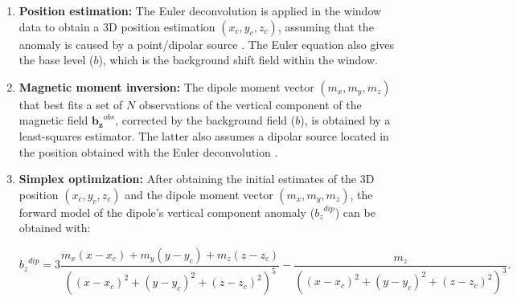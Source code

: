\begin{enumerate}
    \item \textbf{Position estimation:} The Euler deconvolution is applied in the window data to obtain a 3D position estimation $(x_c, y_c, z_c)$, assuming that the anomaly is caused by a point/dipolar source \cite[after][]{Reid1990}. The Euler equation also gives the base level ($b$), which is the background shift field within the window.
    
    \item \textbf{Magnetic moment inversion:} The dipole moment vector $(m_x, m_y, m_z)$ that best fits a set of $N$ observations of the vertical component of the magnetic field $\mathbf{b_z}^{obs}$, corrected by the background field ($b$), is obtained by a least-squares estimator. The latter also assumes a dipolar source located in the position obtained with the Euler deconvolution \citep[\textit{e.g.}][]{Oliveira2015Estimation}.
    
    \item \textbf{Simplex optimization:} After obtaining the initial estimates of the 3D position $(x_c, y_c, z_c)$ and the dipole moment vector $(m_x, m_y, m_z)$, the forward model of the dipole's vertical component anomaly (${b_z}^{dip}$) can be obtained with:
    
    \begin{equation}
        \label{bz_dipole_equation}
        {b_z}^{dip} = 3 \frac{m_x (x-x_c) + m_y (y-y_c) + m_z (z-z_c)}{((x-x_c)^2 + (y-y_c)^2 + (z-z_c)^2)^5} - \frac{m_z}{((x-x_c)^2 + (y-y_c)^2 + (z-z_c)^2)^3} .
    \end{equation}
        
\end{enumerate}
